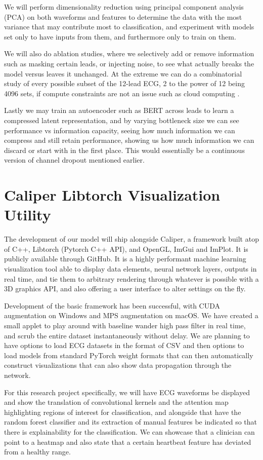 \documentclass[sigconf,nonacm]{acmart}
\begin{document}
We will perform dimensionality reduction using principal component analysis (PCA) on both waveforms and features to determine the data with the most variance that may contribute most to classification, and experiment with models set only to have inputs from them, and furthermore only to train on them.

We will also do ablation studies, where we selectively add or remove information such as masking certain leads, or injecting noise, to see what actually breaks the model versus leaves it unchanged. At the extreme we can do a combinatorial study of every possible subset of the 12-lead ECG, 2 to the power of 12 being 4096 sets, if compute constraints are not an issue such as cloud computing \cite{xue_does_2024}.

Lastly we may train an autoencoder such as BERT across leads to learn a compressed latent representation, and by varying bottleneck size we can see performance vs information capacity, seeing how much information we can compress and still retain performance, showing us how much information we can discard or start with in the first place. This would essentially be a continuous version of channel dropout mentioned earlier.


\section{Caliper Libtorch Visualization Utility}
The development of our model will ship alongside Caliper, a framework built atop of C++, Libtorch (Pytorch C++ API), and OpenGL, ImGui and ImPlot. It is publicly available through GitHub. It is a highly performant machine learning visualization tool able to display data elements, neural network layers, outputs in real time, and tie them to arbitrary rendering through whatever is possible with a 3D graphics API, and also offering a user interface to alter settings on the fly.

Development of the basic framework has been successful, with CUDA augmentation on Windows and MPS augmentation on macOS. We have created a small applet to play around with baseline wander high pass filter in real time, and scrub the entire dataset instantaneously without delay.  We are planning to have options to load ECG datasets in the format of CSV and then options to load models from standard PyTorch weight formats that can then automatically construct visualizations that can also show data propagation through the network.

For this research project specifically, we will have ECG waveforms be displayed and show the translation of convolutional kernels and the attention map highlighting regions of interest for classification, and alongside that have the random forest classifier and its extraction of manual features be indicated so that there is explainability for the classification. We can showcase that a clinician can point to a heatmap and also state that a certain heartbeat feature has deviated from a healthy range.
\end{document}
